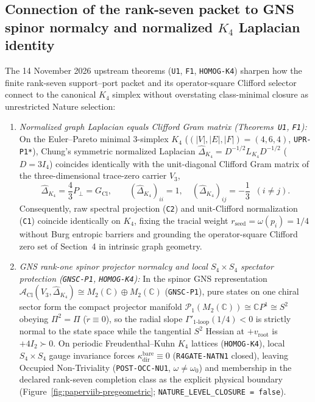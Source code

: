 \documentclass[11pt]{article}
\begin{document}
\subsection{Connection of the rank-seven packet to GNS spinor normalcy and normalized $K_4$ Laplacian identity}
\label{sec:viib-three-pillar-20261114}
The 14 November 2026 upstream theorems (\texttt{U1}, \texttt{F1}, \texttt{HOMOG-K4}) sharpen how the finite rank-seven support--port packet and its operator-square Clifford selector connect to the canonical $K_4$ simplex without overstating class-minimal closure as unrestricted Nature selection:
\begin{enumerate}
\item \emph{Normalized graph Laplacian equals Clifford Gram matrix (Theorems~\texttt{U1}, \texttt{F1}):} On the Euler--Pareto minimal 3-simplex $K_4$ ($(|V|,|E|,|F|)=(4,6,4)$, \texttt{UPR-P1*}), Chung's symmetric normalized Laplacian $\widehat{\Delta}_{K_4}=D^{-1/2}L_{K_4}D^{-1/2}$ ($D=3I_4$) coincides identically with the unit-diagonal Clifford Gram matrix of the three-dimensional trace-zero carrier $V_3$,
\[
  \widehat{\Delta}_{K_4} = \frac{4}{3}P_\perp = G_{\mathrm{Cl}},
  \qquad (\widehat{\Delta}_{K_4})_{ii}=1,\quad (\widehat{\Delta}_{K_4})_{ij}=-\frac{1}{3}\;\;(i\neq j).
\]
Consequently, raw spectral projection (\texttt{C2}) and unit-Clifford normalization (\texttt{C1}) coincide identically on $K_4$, fixing the tracial weight $r_{\mathrm{seed}}=\omega(p_i)=1/4$ without Burg entropic barriers and grounding the operator-square Clifford zero set of Section~4 in intrinsic graph geometry.
\item \emph{GNS rank-one spinor projector normalcy and local $S_4\times S_4$ spectator protection (\texttt{GNSC-P1}, \texttt{HOMOG-K4}):} In the spinor GNS representation $\mathcal{A}_{\mathrm{Cl}}(V_3,\widehat{\Delta}_{K_4})\cong M_2(\mathbb{C})\oplus M_2(\mathbb{C})$ (\texttt{GNSC-P1}), pure states on one chiral sector form the compact projector manifold $\mathcal{P}_1(M_2(\mathbb{C}))\cong\mathbb{C}P^1\cong S^2$ obeying $\Pi^2=\Pi$ ($\dot{r}\equiv 0$), so the radial slope $\Gamma'_{1\text{-loop}}(1/4)<0$ is strictly normal to the state space while the tangential $S^2$ Hessian at $+v_{\mathrm{root}}$ is $+4I_2\succ 0$. On periodic Freudenthal--Kuhn $K_4$ lattices (\texttt{HOMOG-K4}), local $S_4\times S_4$ gauge invariance forces $\kappa_{\mathrm{dir}}^{\mathrm{bare}}\equiv 0$ (\texttt{R4GATE-NATN1} closed), leaving Occupied Non-Triviality (\texttt{POST-OCC-NU1}, $\omega\neq\omega_0$) and membership in the declared rank-seven completion class as the explicit physical boundary (Figure~\ref{fig:paperviib-pregeometric}; \texttt{NATURE\_LEVEL\_CLOSURE = false}).
\end{enumerate}
\end{document}

